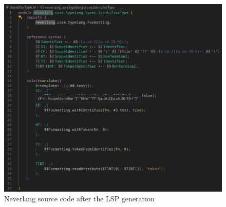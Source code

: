 \begin{figure}[h!]
\begin{minipage}{0.45\textwidth}
        \includegraphics[width=\linewidth]{./imgs/neverlang-lsp-after.png}
        \caption{Neverlang source code after the LSP generation}
    \end{minipage}
    \label{fig:neverlang-lsp-before-after}
\end{figure}



